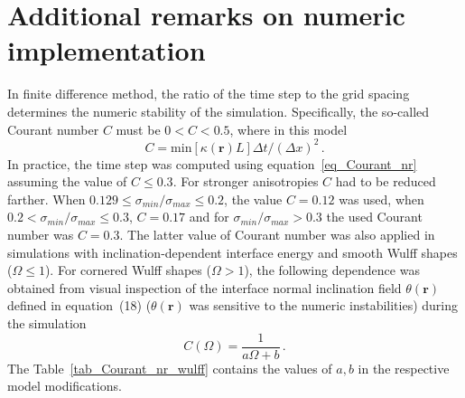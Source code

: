 	\section{Additional remarks on numeric implementation} \label{sec_appendix_numerics}
	In finite difference method, the ratio of the time step to the grid spacing determines the numeric stability of the simulation. Specifically, the so-called Courant number $C$ must be $0<C<0.5$, where in this model
	\begin{equation}\label{eq_Courant_nr}
		C = \mathrm{min}[\kappa(\bm{r}) L]\Delta t/(\Delta x)^2  \,.
	\end{equation}
	In practice, the time step was computed using equation~\eqref{eq_Courant_nr} assuming the value of $C\leq0.3$. For stronger anisotropies $C$ had to be reduced farther. When $0.129\leq \sigma_{min}/\sigma_{max}\leq0.2$, the value $C=0.12$ was used, when $0.2 < \sigma_{min}/\sigma_{max}\leq0.3$, $C=0.17$ and for $\sigma_{min}/\sigma_{max} > 0.3$ the used Courant number was $C=0.3$. The latter value of Courant number was also applied in simulations with inclination-dependent interface energy and smooth Wulff shapes ($\Omega\leq1$). For cornered Wulff shapes ($\Omega>1$), the following dependence was obtained from visual inspection of the interface normal inclination field $\theta(\bm{r})$ defined in equation~(18) ($\theta(\bm{r})$ was sensitive to the numeric instabilities) during the simulation 
	\begin{equation} \label{eq_Courant_nr_wulff}
		C(\Omega) = \frac{1}{a\Omega + b} \,.
	\end{equation}
	The Table~\ref{tab_Courant_nr_wulff} contains the values of $a,b$ in the respective model modifications.
	
